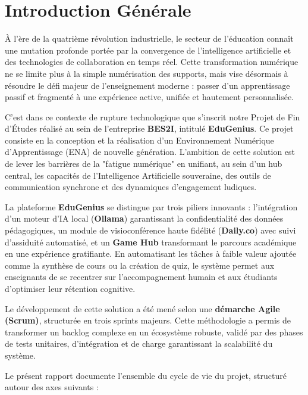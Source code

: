 \chapter*{Introduction Générale}
{}

À l'ère de la quatrième révolution industrielle, le secteur de l'éducation connaît une mutation profonde portée par la convergence de l'intelligence artificielle et des technologies de collaboration en temps réel. Cette transformation numérique ne se limite plus à la simple numérisation des supports, mais vise désormais à résoudre le défi majeur de l'enseignement moderne : passer d'un apprentissage passif et fragmenté à une expérience active, unifiée et hautement personnalisée.

C'est dans ce contexte de rupture technologique que s'inscrit notre Projet de Fin d'Études réalisé au sein de l'entreprise \textbf{BES2I}, intitulé \textbf{EduGenius}. Ce projet consiste en la conception et la réalisation d'un Environnement Numérique d'Apprentissage (ENA) de nouvelle génération. L'ambition de cette solution est de lever les barrières de la "fatigue numérique" en unifiant, au sein d'un hub central, les capacités de l'Intelligence Artificielle souveraine, des outils de communication synchrone et des dynamiques d'engagement ludiques.

La plateforme \textbf{EduGenius} se distingue par trois piliers innovants : l'intégration d'un moteur d'IA local (\textbf{Ollama}) garantissant la confidentialité des données pédagogiques, un module de visioconférence haute fidélité (\textbf{Daily.co}) avec suivi d'assiduité automatisé, et un \textbf{Game Hub} transformant le parcours académique en une expérience gratifiante. En automatisant les tâches à faible valeur ajoutée comme la synthèse de cours ou la création de quiz, le système permet aux enseignants de se recentrer sur l'accompagnement humain et aux étudiants d'optimiser leur rétention cognitive.

Le développement de cette solution a été mené selon une \textbf{démarche Agile (Scrum)}, structurée en trois sprints majeurs. Cette méthodologie a permis de transformer un backlog complexe en un écosystème robuste, validé par des phases de tests unitaires, d'intégration et de charge garantissant la scalabilité du système.

Le présent rapport documente l'ensemble du cycle de vie du projet, structuré autour des axes suivants :

